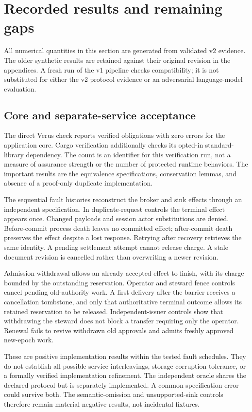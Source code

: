 \section{Recorded results and remaining gaps}
\label{sec:v2results}
All numerical quantities in this section are generated from validated v2
evidence. The older synthetic results are retained against their original
revision in the appendices. A fresh run of the v1 pipeline checks compatibility;
it is not substituted for either the v2 protocol evidence or an adversarial
language-model evaluation.



\subsection{Core and separate-service acceptance}
The direct Verus check reports \VTwoProofs{} verified obligations with zero
errors for the application core. Cargo verification additionally checks its
opted-in standard-library dependency. The count is an identifier for this
verification run, not a measure of assurance strength or the number of protected
runtime behaviors. The important results are the equivalence specifications,
conservation lemmas, and absence of a proof-only duplicate implementation.

The sequential fault histories reconstruct the broker and sink effects through
an independent specification. In duplicate-request controls the terminal effect
appears once. Changed payloads and session actor substitutions are denied.
Before-commit process death leaves no committed effect; after-commit death
preserves the effect despite a lost response. Retrying after recovery retrieves
the same identity. A pending settlement attempt cannot release charge. A stale
document revision is cancelled rather than overwriting a newer revision.

Admission withdrawal allows an already accepted effect to finish, with its
charge bounded by the outstanding reservation. Operator and steward fence
controls cancel pending old-authority work. A first delivery after the barrier
receives a cancellation tombstone, and only that authoritative terminal outcome
allows its retained reservation to be released. Independent-issuer controls
show that withdrawing the steward does not block a transfer requiring only
the operator. Renewal fails to revive withdrawn old approvals and admits freshly
approved new-epoch work.

These are positive implementation results within the tested fault schedules.
They do not establish all possible service interleavings, storage corruption
tolerance, or a formally verified implementation refinement. The independent
oracle shares the declared protocol but is separately implemented. A common
specification error could survive both. The semantic-omission and unsupported-sink
controls therefore remain material negative results, not incidental fixtures.

